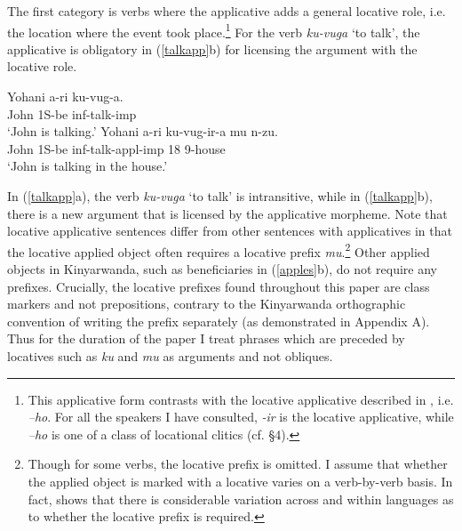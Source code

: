 \documentclass[output=paper]{langsci/langscibook}
\begin{document}
The first category is verbs where the applicative adds a general {\sc locative} role, i.e. the location where the event took place.\footnote{This applicative form contrasts with the locative applicative described in \citet{kimenyi:1980,zeller:2006,zellerngoboka:2006}, i.e. \emph{--ho}. For all the speakers I have consulted, \emph{-ir} is the locative applicative, while \emph{--ho} is one of a class of locational clitics (cf. \S4).} For the verb \emph{ku-vuga} `to talk', the applicative is obligatory in (\ref{talkapp}b) for licensing the argument with the {\sc locative} role. 
	\begin{exe}
		\ex\label{talkapp}\begin{xlist}
		\ex\gll Yohani a-ri ku-vug-a.\\	
				John 1S-{\sc be} {\sc inf}-talk-{\sc imp}\\
				\glt `John is talking.'
		\ex\gll Yohani a-ri ku-vug-ir-a mu n-zu.\\
			John 1S-{\sc be} {\sc inf}-talk-{\sc appl-imp} 18 9-house\\
				\glt `John is talking in the house.'
	\end{xlist}
	\end{exe}
 In (\ref{talkapp}a), the verb \emph{ku-vuga} `to talk' is intransitive, while in (\ref{talkapp}b), there is a new argument that is licensed by the applicative morpheme. Note that locative applicative sentences differ from other sentences with applicatives in that the {\sc locative} applied object often requires a locative prefix \emph{mu}.\footnote{Though for some verbs, the locative prefix is omitted. I assume that whether the applied object is marked with a locative varies on a verb-by-verb basis. In fact, \citet{rugemalira:2003} shows that there is considerable variation across and within languages as to whether the locative prefix is required.} Other applied objects in Kinyarwanda, such as {\sc beneficiaries} in (\ref{apples}b), do not require any prefixes. Crucially, the locative prefixes found throughout this paper are class markers and not prepositions, contrary to the Kinyarwanda orthographic convention of writing the prefix separately (as demonstrated in Appendix A). Thus for the duration of the paper I treat phrases which are preceded by locatives such as \emph{ku} and \emph{mu} as arguments and not obliques.  
\end{document}
